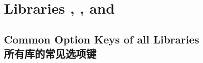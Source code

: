 \section{Libraries
  ,
  , and
  }\label{sec:listings}%
%

% 
% 
% 
% 
% 
% 



\subsection{Common Option Keys of all Libraries\\所有库的常见选项键}\label{sec:commonlistingkeys}




